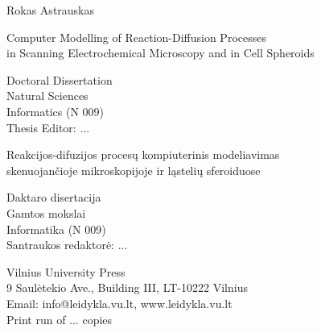 \pagestyle{empty}

\iffalse   
\begin{center}   %
NOTES
\end{center}
\newpage
\fi

\cleardoublepage



\vspace{165mm}

\begin{flushleft}
Rokas Astrauskas
	
Computer Modelling of Reaction-Diffusion Processes\\ 
in Scanning Electrochemical Microscopy and in Cell Spheroids

Doctoral Dissertation\\
Natural Sciences\\
Informatics (N 009)\\
Thesis Editor: ...


\vspace{3cm}

Reakcijos-difuzijos procesų kompiuterinis modeliavimas\\
skenuojančioje mikroskopijoje ir ląstelių sferoiduose

Daktaro disertacija\\
Gamtos mokslai\\
Informatika (N 009)\\
Santraukos redaktorė: ...


\end{flushleft}




\vspace{165mm}

{
	\vspace*{\fill}
	
	\centering
Vilnius University Press\\
9 Saulėtekio Ave., Building III, LT-10222 Vilnius\\
Email: info@leidykla.vu.lt, www.leidykla.vu.lt\\
Print run of ... copies\\
}
